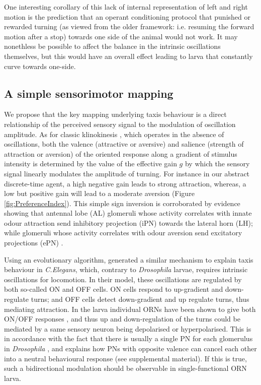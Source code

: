 \documentclass[11pt,a4paper]{article}
\newcommand{\Dros }{\emph{Drosophila }}
\newcommand{\todoAW}[1]{\todo[author=AW,color=green, size=\tiny,inline]{#1}}
\newcommand{\todoBW}[1]{\todo[author=BW,color=orange, size=\tiny,inline]{#1}}
\newcommand{\todoML}[1]{\todo[author=ML,color=white, size=\tiny,inline]{#1}}
\begin{document}
  One interesting corollary of this lack of internal representation of left and right motion is the prediction that an operant conditioning protocol that punished or rewarded turning (as viewed from the older framework: i.e. resuming the forward motion after a stop) towards one side of the animal would not work. It may nonethless be possible to affect the balance in the intrinsic oscillations themselves, but this would have an overall effect leading to larva that constantly curve towards one-side.


\subsection{A simple sensorimotor mapping}
We propose that the key mapping underlying taxis behaviour is a direct relationship of the perceived sensory signal to the modulation of oscillation amplitude.
As for classic klinokinesis \citep{benhamou1989animals}, which operates in the absence of oscillations, both the valence (attractive or aversive) and salience (strength of attraction or aversion) of the oriented response along a gradient of stimulus intensity is determined by the value of the effective gain $g$ by which the sensory signal linearly modulates the amplitude of turning.
 For instance in our abstract discrete-time agent, a high negative gain leads to strong attraction, whereas, a low but positive gain will lead to a moderate aversion (Figure \ref{fig:PreferenceIndex}).
 This simple sign inversion is corroborated by evidence showing that antennal lobe (AL) glomeruli whose activity correlates with innate odour attraction send inhibitory projection (iPN) towards the lateral horn (LH); while glomeruli whose activity correlates with odour aversion send excitatory projections (ePN) \citep{liang2013gabaergic, knaden2012spatial}. 

Using an evolutionary algorithm, \cite{izquierdo2010evolution} generated a similar mechanism to explain taxis behaviour in {\it C.Elegans}, which, contrary to \Dros larvae, requires intrinsic oscillations for locomotion.
 In their model, these oscillations are regulated by both so-called ON and OFF cells. ON cells respond to up-gradient and down-regulate turns; and OFF cells detect down-gradient and up regulate turns, thus mediating attraction.
  In the larva individual ORNs have been shown to give both ON/OFF responses \citep{schulze2015dynamical}, and thus up and down-regulation of the turns could be mediated by a same sensory neuron being depolarised or hyperpolarised.
   This is in accordance with the fact that there is usually a single PN for each glomerulus in \Dros \citep{ramaekers2005glomerular}, %
 and explains how PNs with opposite valence can cancel each other into a neutral behavioural response (see supplemental material). If this is true, such a bidirectional modulation should be observable in single-functional ORN larva. 
  
\end{document}
